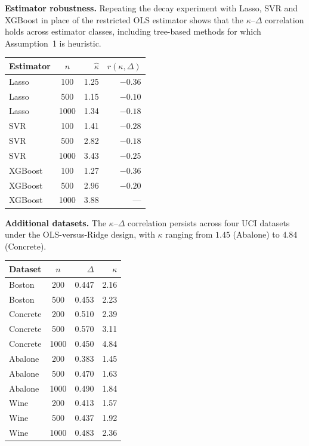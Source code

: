 \documentclass[lineno]{biometrika}
\begin{document}
{\small
\textbf{Estimator robustness.}
Repeating the decay experiment with Lasso, SVR and XGBoost in place of the restricted OLS estimator shows that the $\kappa$--$\Delta$ correlation holds across estimator classes, including tree-based methods for which Assumption~1 is heuristic.
\begin{table}[ht]
{\begin{tabular}{lcrr}
Estimator & $n$ & $\hat\kappa$ & $r(\kappa,\Delta)$ \\ \hline
Lasso & 100 & 1.25 & $-0.36$ \\
Lasso & 500 & 1.15 & $-0.10$ \\
Lasso & 1000 & 1.34 & $-0.18$ \\
SVR & 100 & 1.41 & $-0.28$ \\
SVR & 500 & 2.82 & $-0.18$ \\
SVR & 1000 & 3.43 & $-0.25$ \\
XGBoost & 100 & 1.27 & $-0.36$ \\
XGBoost & 500 & 2.96 & $-0.20$ \\
XGBoost & 1000 & 3.88 & ---
\end{tabular}}
\end{table}

\textbf{Additional datasets.}
The $\kappa$--$\Delta$ correlation persists across four UCI datasets under the OLS-versus-Ridge design, with $\kappa$ ranging from $1.45$ (Abalone) to $4.84$ (Concrete).
\begin{table}[ht]
\small
{}
{\begin{tabular}{lcrr}
Dataset & $n$ & $\Delta$ & $\kappa$ \\ \hline
Boston & 200 & 0.447 & 2.16 \\
Boston & 500 & 0.453 & 2.23 \\
Concrete & 200 & 0.510 & 2.39 \\
Concrete & 500 & 0.570 & 3.11 \\
Concrete & 1000 & 0.450 & 4.84 \\
Abalone & 200 & 0.383 & 1.45 \\
Abalone & 500 & 0.470 & 1.63 \\
Abalone & 1000 & 0.490 & 1.84 \\
Wine & 200 & 0.413 & 1.57 \\
Wine & 500 & 0.437 & 1.92 \\
Wine & 1000 & 0.483 & 2.36
\end{tabular}}
\end{table}

}  %
\end{document}
